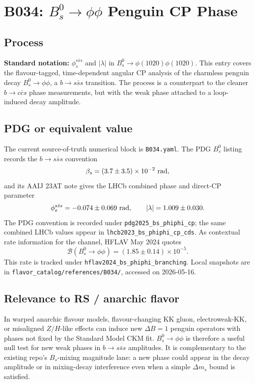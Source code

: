 
\section{B034: \(B_s^0\to\phi\phi\) Penguin CP Phase}

\subsection*{Process}
\textbf{Standard notation:} \(\phi_s^{s\bar{s}s}\) and \(|\lambda|\) in
\(B_s^0\to\phi(1020)\phi(1020)\).  This entry covers the flavour-tagged,
time-dependent angular CP analysis of the charmless penguin decay
\(B_s^0\to\phi\phi\), a \(b\to s\bar{s}s\) transition.  The process is a
counterpart to the cleaner \(b\to c\bar c s\) phase measurements, but with the
weak phase attached to a loop-induced decay amplitude.

\subsection*{PDG or equivalent value}
The current source-of-truth numerical block is \texttt{B034.yaml}.  The PDG
\(B_s^0\) listing records the \(b\to s\bar{s}s\) convention
\[
  \beta_s=(3.7\pm3.5)\times 10^{-2}\ {\rm rad},
\]
and its AAIJ 23AT note gives the LHCb combined phase and direct-CP parameter
\[
  \phi_s^{s\bar{s}s}=-0.074\pm0.069\ {\rm rad},\qquad
  |\lambda|=1.009\pm0.030 .
\]
The PDG convention is recorded under \texttt{pdg2025\_bs\_phiphi\_cp}; the
same combined LHCb values appear in \texttt{lhcb2023\_bs\_phiphi\_cp\_cds}.
As contextual rate information for the channel, HFLAV May 2024 quotes
\[
  \mathcal B(B_s^0\to\phi\phi)=(1.85\pm0.14)\times 10^{-5}.
\]
This rate is tracked under \texttt{hflav2024\_bs\_phiphi\_branching}.  Local
snapshots are in \texttt{flavor\_catalog/references/B034/}, accessed on
2026-05-16.

\subsection*{Relevance to RS / anarchic flavor}
In warped anarchic flavour models, flavour-changing KK gluon, electroweak-KK,
or misaligned \(Z/H\)-like effects can induce new \(\Delta B=1\) penguin
operators with phases not fixed by the Standard Model CKM fit.  \(B_s^0\to
\phi\phi\) is therefore a useful null test for new weak phases in
\(b\to s\bar{s}s\) amplitudes.  It is complementary to the existing repo's
\(B_s\)-mixing magnitude lane: a new phase could appear in the decay amplitude
or in mixing-decay interference even when a simple \(\Delta m_s\) bound is
satisfied.

